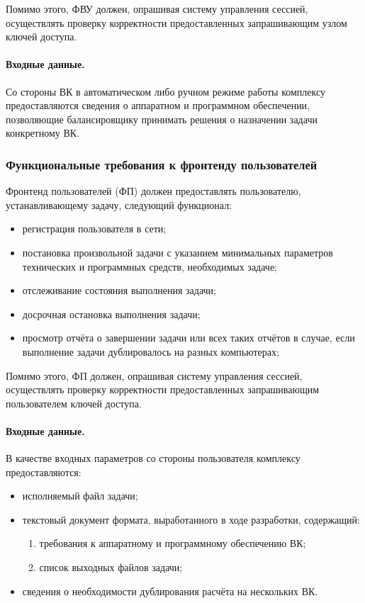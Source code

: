 \documentclass[a4paper,12pt]{report}
\numberwithin{equation}{section}
\begin{document}
Помимо этого, ФВУ должен, опрашивая систему управления сессией, осуществлять проверку корректности предоставленных запрашивающим узлом ключей доступа.

\paragraph{Входные данные.}
Со стороны ВК в автоматическом либо ручном режиме работы комплексу предоставляются сведения о аппаратном и программном обеспечении, 
позволяющие балансировщику принимать решения о назначении задачи конкретному ВК.

\subsubsection{Функциональные требования к фронтенду пользователей}
Фронтенд пользователей (ФП) должен предоставлять пользователю, устанавливающему задачу, следующий функционал:

\begin{itemize}
    \item регистрация пользователя в сети;
    \item постановка произвольной задачи с указанием минимальных параметров технических и программных средств, необходимых задаче;
    \item отслеживание состояния выполнения задачи;
    \item досрочная остановка выполнения задачи;
    \item просмотр отчёта о завершении задачи или всех таких отчётов в случае, если выполнение задачи дублировалось на разных компьютерах;
\end{itemize}
Помимо этого, ФП должен, опрашивая систему управления сессией, осуществлять проверку корректности предоставленных запрашивающим пользователем ключей доступа.


\paragraph{Входные данные.}
В качестве входных параметров со стороны пользователя комплексу предоставляются:
\begin{itemize}
    \item исполняемый файл задачи;
    \item текстовый документ формата, выработанного в ходе разработки, содержащий: 
    \begin{enumerate}
        \item требования к аппаратному и программному обеспечению ВК;
        \item список выходных файлов задачи;
    \end{enumerate}
    \item сведения о необходимости дублирования расчёта на нескольких ВК.
\end{itemize}
\end{document}

